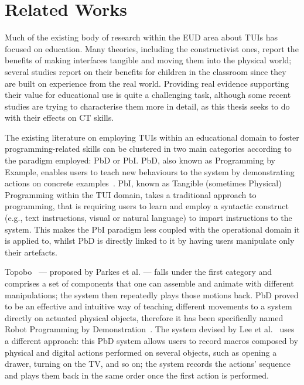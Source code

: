 \section{Related Works}\label{sec:tp}
Much of the existing body of research within the \ac{EUD} area about \acp{TUI} has focused on education. Many theories, including the constructivist ones, report the benefits of making interfaces tangible and moving them into the physical world; several studies report on their benefits for children in the classroom since they are built on experience from the real world. Providing real evidence supporting their value for educational use is quite a challenging task, although some recent studies are trying to characterise them more in detail, as this thesis seeks to do with their effects on \ac{CT} skills.

The existing literature on employing \acp{TUI} within an educational domain to foster programming-related skills can be clustered in two main categories according to the paradigm employed: \ac{PbD} or \ac{PbI}. \ac{PbD}, also known as Programming by Example, enables users to teach new behaviours to the system by demonstrating actions on concrete examples~\cite{2001:YWM:369505}. \ac{PbI}, known as Tangible (sometimes Physical) Programming within the \ac{TUI} domain, takes a traditional approach to programming, that is requiring users to learn and employ a syntactic construct (e.g., text instructions, visual or natural language) to impart instructions to the system. This makes the \ac{PbI} paradigm less coupled with the operational domain it is applied to, whilst \ac{PbD} is directly linked to it by having users manipulate only their artefacts.

Topobo~\cite{Parkes:2008bu} --- proposed by Parkes et al. --- falls under the first category and comprises a set of components that one can assemble and animate with different manipulations; the system then repeatedly plays those motions back. \ac{PbD} proved to be an effective and intuitive way of teaching different movements to a system directly on actuated physical objects, therefore it has been specifically named Robot Programming by Demonstration~\cite{Billard:2008kb}. The system devised by Lee et al.~\cite{Lee:2013gya} uses a different approach: this \ac{PbD} system allows users to record macros composed by physical and digital actions performed on several objects, such as opening a drawer, turning on the TV, and so on; the system records the actions' sequence and plays them back in the same order once the first action is performed.


